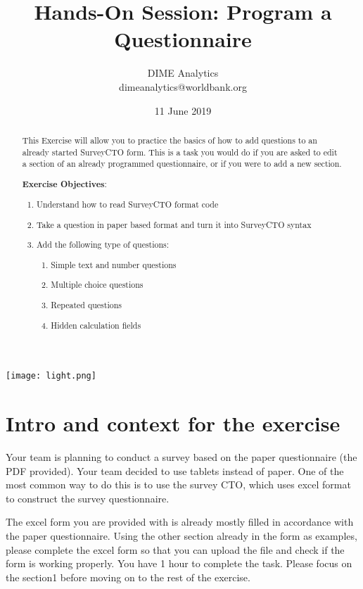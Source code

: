 \documentclass{tufte-handout}
\title{Hands-On Session: Program a Questionnaire}
\author{DIME Analytics \\ dimeanalytics@worldbank.org}
\date{11 June 2019}  %
\begin{document}
\maketitle%

\begin{marginfigure}%
  \texttt{[image: light.png]}
\end{marginfigure}

\begin{abstract}
This Exercise will allow you to practice the basics of how to add questions to an already started SurveyCTO form. This is a task you would do if you are asked to edit a section of an already programmed questionnaire, or if you were to add a new section.


\bigskip\noindent \textbf{Exercise Objectives}:
\begin{enumerate}
  \item Understand how to read SurveyCTO format code
  \item Take a question in paper based format and turn it into SurveyCTO syntax
  \item Add the following type of questions:
  \begin{enumerate}
  	\item Simple text and number questions
  	\item Multiple choice questions
  	\item Repeated questions
	\item Hidden calculation fields
  \end{enumerate}
\end{enumerate}
\end{abstract}

\section{Intro and context for the exercise}

Your team is planning to conduct a survey based on the paper questionnaire (the PDF provided). Your team decided to use tablets instead of paper. One of the most common way to do this is to use the survey CTO, which uses excel format to construct the survey questionnaire. 

The excel form you are provided with is already mostly filled in accordance with the paper questionnaire. Using the other section already in the form as examples, please complete the excel form so that you can upload the file and check if the form is working properly. You have 1 hour to complete the task. Please focus on the section1 before moving on to the rest of the exercise. 
\end{document}
